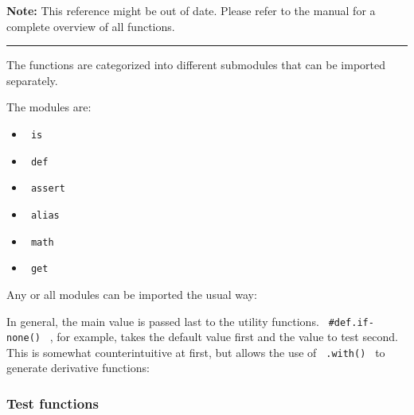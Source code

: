 \textbf{Note:} This reference might be out of date. Please refer to the
manual for a complete overview of all functions.

\begin{center}\rule{0.5\linewidth}{0.5pt}\end{center}

The functions are categorized into different submodules that can be
imported separately.

The modules are:

\begin{itemize}
\tightlist
\item
  \texttt{\ is\ }
\item
  \texttt{\ def\ }
\item
  \texttt{\ assert\ }
\item
  \texttt{\ alias\ }
\item
  \texttt{\ math\ }
\item
  \texttt{\ get\ }
\end{itemize}

Any or all modules can be imported the usual way:

\begin{Shaded}
\begin{Highlighting}[]
\OperatorTok{:} \OperatorTok{*}
\OperatorTok{:}\OperatorTok{,}
\end{Highlighting}
\end{Shaded}

In general, the main value is passed last to the utility functions.
\texttt{\ \#def.if-none()\ } , for example, takes the default value
first and the value to test second. This is somewhat counterintuitive at
first, but allows the use of \texttt{\ .with()\ } to generate derivative
functions:

\begin{Shaded}
\begin{Highlighting}[]
\OperatorTok{{-}}\OperatorTok{=}\NormalTok{(}\NormalTok{)}
\end{Highlighting}
\end{Shaded}

\subsubsection{Test functions}\label{test-functions}

